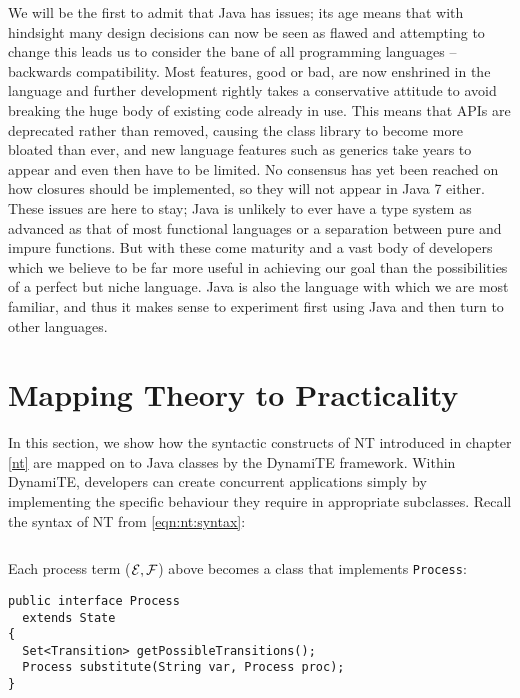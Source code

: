 We will be the first to admit that Java has issues; its age means that
with hindsight many design decisions can now be seen as flawed and
attempting to change this leads us to consider the bane of all
programming languages -- backwards compatibility.  Most features, good
or bad, are now enshrined in the language and further development
rightly takes a conservative attitude to avoid breaking the huge body
of existing code already in use.  This means that APIs are deprecated
rather than removed, causing the class library to become more bloated
than ever, and new language features such as generics take years to
appear and even then have to be limited.  No consensus has yet been
reached on how closures should be implemented, so they will not appear
in Java 7 either.  These issues are here to stay; Java is unlikely to
ever have a type system as advanced as that of most functional
languages or a separation between pure and impure functions.  But with
these come maturity and a vast body of developers which we believe to
be far more useful in achieving our goal than the possibilities of a
perfect but niche language.  Java is also the language with which we
are most familiar, and thus it makes sense to experiment first using
Java and then turn to other languages.

\section{Mapping Theory to Practicality}
\label{dyn:maptheory}

In this section, we show how the syntactic constructs of NT introduced
in chapter \ref{nt} are mapped on to Java classes by the DynamiTE
framework.  Within DynamiTE, developers can create concurrent
applications simply by implementing the specific behaviour they
require in appropriate subclasses.  Recall the syntax of NT from
\ref{eqn:nt:syntax}:

\begin{equation}
  
\end{equation}

Each process term ($\text{$\mathcal{E}$}, \text{$\mathcal{F}$}$) above becomes a class that
implements \texttt{Process}:

\begin{verbatim}
public interface Process
  extends State
{
  Set<Transition> getPossibleTransitions();
  Process substitute(String var, Process proc);
}
\end{verbatim}

